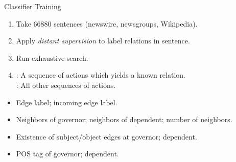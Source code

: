 \def\title{Classifier Training}
\begin{frame}{\title}
\begin{enumerate}
  \item Take \num{66880} sentences (newswire, newsgroups, Wikipedia).
  \pause
  \item Apply \textit{distant supervision} to label relations in sentence.
  \pause
  \item Run exhaustive search.
  \pause
  \item {}: A sequence of actions which yields a known relation. \\
        : All other sequences of actions.
\end{enumerate}
\hspace{0.5em}
\pause

\begin{itemize}
  \item Edge label; incoming edge label.
  \item Neighbors of governor; neighbors of dependent; number of neighbors.
  \item Existence of subject/object edges at governor; dependent.
  \item POS tag of governor; dependent.
\end{itemize}
\end{frame}
